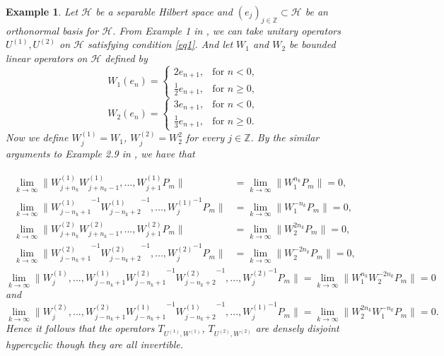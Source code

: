 \documentclass{article}
\newtheorem {example}[theorem]{Example}
\begin{document}
\begin{example} \textnormal{
Let $\mathcal{H}$ be a separable Hilbert space and $(e_{j})_{j\in\mathbb{Z}}\subset\mathcal{H}$ be an orthonormal basis for $\mathcal{H}$. From Example 1 in \cite{IT21}, we can take unitary operators $U^{(1)},U^{(2)}$ on $\mathcal{H}$ satisfying condition \eqref{eq1}.
And let $W_{1}$ and $W_{2}$ be bounded linear operators on $\mathcal{H}$ defined by
\begin{displaymath}
W_{1}(e_{n})=\left\{ \begin{array}{ll}
 2e_{n+1}, & \textrm{for } n<0,\\
 \frac{1}{2}e_{n+1}, & \textrm{for } n\geq 0,
\end{array} \right.
\end{displaymath}
\begin{displaymath}
W_{2}(e_{n})=\left\{ \begin{array}{ll}
 3e_{n+1}, & \textrm{for } n<0,\\
 \frac{1}{3}e_{n+1}, & \textrm{for } n\geq 0.
\end{array} \right.
\end{displaymath}
Now we define $W^{(1)}_{j}=W_{1}$, $W^{(2)}_{j}=W^{2}_{2}$ for every $j\in \mathbb{Z}$.
By the similar arguments to Example 2.9 in \cite{IT23dis}, we have that}

\begin{eqnarray}\begin{split}\nonumber
\lim_{k\rightarrow\infty}\|W^{(1)}_{j+n_{k}}W^{(1)}_{j+n_{k}-1},...,W^{(1)}_{j+1}P_{m}\|&= \lim_{k\rightarrow\infty}\|W^{n_{k}}_{1}P_{m}\|=0,\\
\lim_{k\rightarrow\infty}\|{W^{(1)}_{j-n_{k}+1}}^{-1}{W^{(1)}_{j-n_{k}+2}}^{-1},...,{W^{(1)}_{j}}^{-1}P_{m}\|&= \lim_{k\rightarrow\infty}\|W^{-n_{k}}_{1}P_{m}\|=0,\\
\lim_{k\rightarrow\infty}\|W^{(2)}_{j+n_{k}}W^{(2)}_{j+n_{k}-1},...,W^{(2)}_{j+1}P_{m}\|&= \lim_{k\rightarrow\infty}\|W^{2n_{k}}_{2}P_{m}\|=0,\\
\lim_{k\rightarrow\infty}\|{W^{(2)}_{j-n_{k}+1}}^{-1}{W^{(2)}_{j-n_{k}+2}}^{-1},...,{W^{(2)}_{j}}^{-1}P_{m}\|&= \lim_{k\rightarrow\infty}\|W^{-2n_{k}}_{2}P_{m}\|=0,
\end{split}\end{eqnarray}
\textnormal{
\[\lim_{k\rightarrow\infty}\|W^{(1)}_{j},...,W^{(1)}_{j-n_{k}+1}{W^{(2)}_{j-n_{k}+1}}^{-1}{W^{(2)}_{j-n_{k}+2}}^{-1},...,
 {W^{(2)}_{j}}^{-1}P_{m}\|=\lim_{k\rightarrow\infty}\|W^{n_{k}}_{1}W^{-2n_{k}}_{2}P_{m}\|=0\]
 and
\[\lim_{k\rightarrow\infty}\|W^{(2)}_{j},...,W^{(2)}_{j-n_{k}+1}{W^{(1)}_{j-n_{k}+1}}^{-1}{W^{(1)}_{j-n_{k}+2}}^{-1},...,
 {W^{(1)}_{j}}^{-1}P_{m}\|=\lim_{k\rightarrow\infty}\|W^{2n_{k}}_{2}W^{-n_{k}}_{1}P_{m}\|=0.\]
Hence it follows that the operators $T_{U^{(1)},W^{(1)}}$, $T_{U^{(2)},W^{(2)}}$ are densely disjoint hypercyclic though they are all invertible.
}
\end{example}
\end{document}
